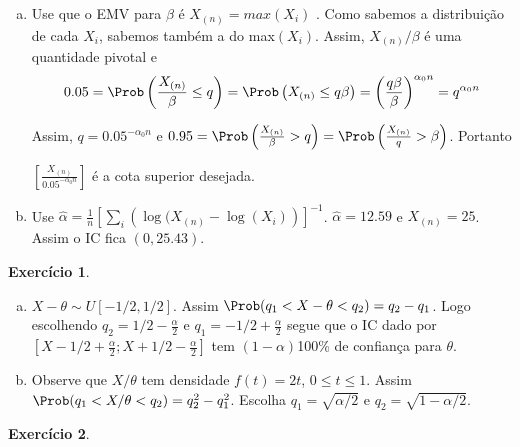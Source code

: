 \documentclass[letter,11pt]{article}
\newtheorem{exer}{Exercício}
\begin{document}
\begin{enumerate}[a)]
\item %
Use que o EMV para $\beta$ é $X_{(n)}=max(X_i)$ . Como sabemos a distribuição de cada $X_i$, sabemos também a do max$(X_i)$. Assim, $X_{(n)}/\beta$ é uma quantidade pivotal e 
\[0.05=\Prob\left(\frac{X_{(n)}}{\beta}\leq q\right)
=\Prob\left(X_{(n)}\leq q\beta\right)=\left(\frac{q\beta}{\beta}\right)^{\alpha_0n}=q^{\alpha_0n}\] 

Assim, $q=0.05^{-\alpha_0n}$ e  $0.95=\Prob\left(\frac{X_{(n)}}{\beta}> q\right)=\Prob\left(\frac{X_{(n)}}{q}> \beta\right)$. Portanto 

$[\frac{X_{(n)}}{0.05^{-\alpha_0n}}]$ é a cota superior desejada.
\item Use $\hat{\alpha}=\frac{1}{n}\left[\sum_i\left( \log(X_{(n)}-\log(X_i)\right)\right]^{-1}$. $\hat{\alpha}= 12.59$ e  $X_{(n)} = 25$. Assim o IC fica $(0, 25.43)$.
\end{enumerate}

\begin{exer} \rm %
\end{exer}

\begin{enumerate}[a)]
\item  $X-\theta\sim U[-1/2,1/2]$. Assim $\Prob(q_1<X-\theta<q_2)=q_2-q_1$. Logo escolhendo $q_2=1/2-\frac{\alpha}{2}$ e $q_1=-1/2+\frac{\alpha}{2}$ segue que o IC dado por  $[X-1/2+\frac{\alpha}{2};X+1/2-\frac{\alpha}{2}]$ tem $(1-\alpha)$100\%  de confiança para $\theta$. 
\item Observe que $X/\theta$ tem densidade $f(t)=2t$, $0\leq t\leq 1$. Assim  $\Prob(q_1<X/\theta<q_2)=q_2^2-q_1^2$. Escolha $q_1=\sqrt{\alpha/2}$ e $q_2=\sqrt{1-\alpha/2}$.
\end{enumerate}


\begin{exer} \rm
\end{exer}
\end{document}
